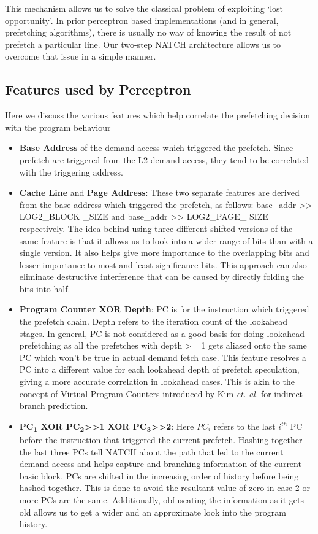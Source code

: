 This mechanism allows us to solve the classical problem of exploiting
`lost opportunity'.  In prior perceptron based implementations (and in
general, prefetching algorithms), there is usually no way of knowing
the result of not prefetch a particular line.  Our two-step NATCH
architecture allows us to overcome that issue in a simple manner.

\subsection{Features used by Perceptron}
\label{Design-Features}
Here we discuss the various features which help correlate the
prefetching decision with the program behaviour
\begin{itemize}
\item \textbf{Base Address} of the demand access which triggered the
  prefetch.  Since prefetch are triggered from the L2 demand access,
  they tend to be correlated with the triggering address.

\item \textbf{Cache Line} and \textbf{Page Address}: These two
  separate features are derived from the base address which triggered
  the prefetch, as follows: base\_addr >> LOG2\_BLOCK \_SIZE and
  base\_addr >> LOG2\_PAGE\_ SIZE respectively.  The idea behind using
  three different shifted versions of the same feature is that it
  allows us to look into a wider range of bits than with a single
  version.  It also helps give more importance to the overlapping bits
  and lesser importance to most and least significance bits.  This
  approach can also eliminate destructive interference that can be
  caused by directly folding the bits into half.


\item \textbf{Program Counter XOR Depth}: PC is for the instruction
  which triggered the prefetch chain.  Depth refers to the iteration
  count of the lookahead stages.  In general, PC is not considered as
  a good basis for doing lookahead prefetching as all the prefetches
  with depth >= 1 gets aliased onto the same PC which won't be true in
  actual demand fetch case.  This feature resolves a PC into a
  different value for each lookahead depth of prefetch speculation, giving
  a more accurate correlation in lookahead cases.  This is akin to the
  concept of Virtual Program Counters\cite{VPC} introduced by Kim
  \textit{et. al.} for indirect branch prediction.


\item \textbf{PC\textsubscript{1} XOR PC\textsubscript{2}>>1 XOR
    PC\textsubscript{3}>>2}: Here $PC_i$ refers to the last $i^{th}$
  PC before the instruction that triggered the current prefetch.
  Hashing together the last three PCs tell NATCH about the path
  that led to the current demand access and helps capture and
  branching information of the current basic block.  PCs are shifted
  in the increasing order of history before being hashed together.
  This is done to avoid the resultant value of zero in case 2 or more
  PCs are the same.  Additionally, obfuscating the information as it
  gets old allows us to get a wider and an approximate look into the
  program history.


\end{itemize}
